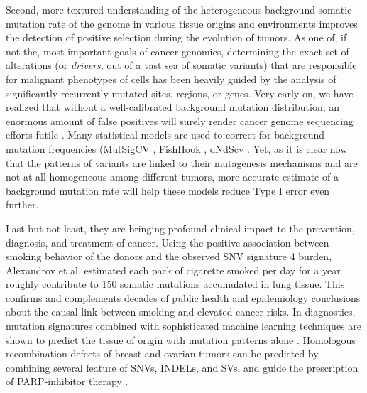 \documentclass[phd,tocprelim]{cornell}
\begin{document}
Second, more textured understanding of the heterogeneous background somatic mutation rate of the genome in various tissue origins and environments improves the detection of positive selection during the evolution of tumors. As one of, if not the, most important goals of cancer genomics, determining the exact set of alterations (or \textit{drivers}, out of a vast sea of somatic variants) that are responsible for malignant phenotypes of cells has been heavily guided by the analysis of significantly recurrently mutated sites, regions, or genes. Very early on, we have realized that without a well-calibrated background mutation distribution, an enormous amount of false positives will surely render cancer genome sequencing efforts futile \cite{Getz2007-wf}. Many statistical models are used to correct for background mutation frequencies (MutSigCV \cite{lawrence2013}, FishHook \cite{imielinski2017}, dNdScv \cite{Martincorena2017-yt}. Yet, as it is clear now that the patterns of variants are linked to their mutagenesis mechanisms and are not at all homogeneous among different tumors, more accurate estimate of a background mutation rate will help these models reduce Type I error even further.

Last but not least, they are bringing profound clinical impact to the prevention, diagnosis, and treatment of cancer. Using the positive association between smoking behavior of the donors and the observed SNV signature 4 burden, Alexandrov et al. \cite{Alexandrov2016-zs} estimated each pack of cigarette smoked per day for a year roughly contribute to 150 somatic mutations accumulated in lung tissue. This confirms and complements decades of public health and epidemiology conclusions about the causal link between smoking and elevated cancer risks. In diagnostics, mutation signatures combined with sophisticated machine learning techniques are shown to predict the tissue of origin with mutation patterns alone \cite{Jiao2020-le}. Homologous recombination defects of breast and ovarian tumors can be predicted by combining several feature of SNVs, INDELs, and SVs, and guide the prescription of PARP-inhibitor therapy \cite{Davies:2017642}.
\end{document}
